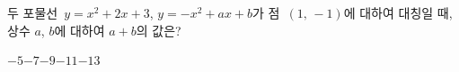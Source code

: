두 포물선~$y=x^2+2x+3$, $y=-x^2+ax+b$가 점~$(1,\,-1)$에 대하여 대칭일 때, 상수 $a$, $b$에 대하여 $a+b$의 값은?
\begin{choices32}{$-5$}{$-7$}{$-9$}{$-11$}{$-13$}\end{choices32}
